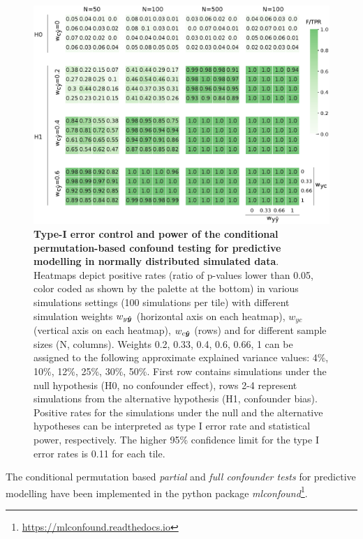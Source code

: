 \documentclass{article}
\begin{document}
\begin{figure}[!b]
  \centering
  \includegraphics[width=0.75\paperwidth]{fig/sim_normal.eps}
  \caption{\textbf{Type-I error control and power of the conditional permutation-based confound testing for predictive modelling in normally distributed simulated data}. \\
  Heatmaps depict positive rates (ratio of p-values lower than 0.05, color coded as shown by the palette at the bottom) in various simulations settings (100 simulations per tile) with different simulation weights $w_{y\boldsymbol{\hat{y}}}$ (horizontal axis on each heatmap), $w_{yc}$ (vertical axis on each heatmap), $w_{c\boldsymbol{\hat{y}}}$ (rows) and for different sample sizes (N, columns). Weights 0.2, 0.33, 0.4, 0.6, 0.66, 1 can be assigned to the following approximate explained variance values: 4\%, 10\%, 12\%, 25\%, 30\%, 50\%. First row contains simulations under the null hypothesis (H0, no confounder effect), rows 2-4 represent simulations from the alternative hypothesis (H1, confounder bias).
  Positive rates for the simulations under the null and the alternative hypotheses can be interpreted as type I error rate and statistical power, respectively. The higher 95\% confidence limit for the type I error rates is 0.11 for each tile.
  }
  \label{fig:sim-normal}
\end{figure}

The conditional permutation based \emph{partial} and \emph{full confounder tests} for predictive modelling have been implemented in the python package \emph{mlconfound}\footnote{\href{https://mlconfound.readthedocs.io}{https://mlconfound.readthedocs.io}}.
\end{document}
